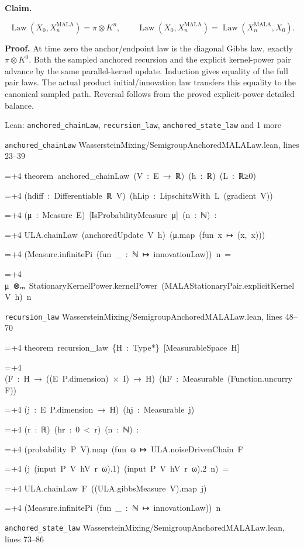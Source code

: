 \documentclass[11pt,a4paper]{report}
\newlength{\leancharwidth}
\newenvironment{leancode}{\par\smallskip\begingroup\ttfamily\footnotesize\raggedright
  \settowidth{\leancharwidth}{M}\setlength{\parskip}{0pt}\setlength{\parindent}{0pt}
  \frenchspacing}{\par\endgroup\smallskip}
\newcommand{\leanline}[2]{\hangindent=\dimexpr#1\leancharwidth+4\leancharwidth\relax
  \hangafter=1\noindent\hspace*{#1\leancharwidth}#2\par}
\newcommand{\leansource}[1]{\par{\footnotesize\color{leanmuted}#1}\par}
\begin{document}
\textbf{Claim.}

\[\operatorname{Law}(X_0,X_n^{\mathrm{MALA}})=\pi\otimes K^n,\qquad \operatorname{Law}(X_0,X_n^{\mathrm{MALA}})=\operatorname{Law}(X_n^{\mathrm{MALA}},X_0).\]

\textbf{Proof.} At time zero the anchor/\allowbreak{}endpoint law is the diagonal Gibbs law, exactly \(\pi\otimes K^0\). Both the sampled anchored recursion and the explicit kernel-power pair advance by the same parallel-kernel update. Induction gives equality of the full pair laws. The actual product initial/\allowbreak{}innovation law transfers this equality to the canonical sampled path. Reversal follows from the proved explicit-power detailed balance.

\begin{leanbox}{Lean: \texttt{anchored\_\allowbreak{}chainLaw}, \texttt{recursion\_\allowbreak{}law}, \texttt{anchored\_\allowbreak{}state\_\allowbreak{}law} and 1 more}
\leansource{\texttt{anchored\_\allowbreak{}chainLaw} \quad WassersteinMixing/\allowbreak{}SemigroupAnchoredMALALaw.lean, lines 23–39}
\begin{leancode}
\leanline{0}{theorem\ anchored\_chainLaw\ (V\ :\ E\ →\ ℝ)\ (h\ :\ ℝ)\ (L\ :\ ℝ≥0)}
\leanline{4}{(hdiff\ :\ Differentiable\ ℝ\ V)\ (hLip\ :\ LipschitzWith\ L\ (gradient\ V))}
\leanline{4}{(μ\ :\ Measure\ E)\ [IsProbabilityMeasure\ μ]\ (n\ :\ ℕ)\ :}
\leanline{4}{ULA.chainLaw\ (anchoredUpdate\ V\ h)\ (μ.map\ (fun\ x\ ↦\ (x,\ x)))}
\leanline{6}{(Measure.infinitePi\ (fun\ \_\ :\ ℕ\ ↦\ innovationLaw))\ n\ =}
\leanline{8}{μ\ ⊗ₘ\ StationaryKernelPower.kernelPower\ (MALAStationaryPair.explicitKernel\ V\ h)\ n}
\end{leancode}
\leansource{\texttt{recursion\_\allowbreak{}law} \quad WassersteinMixing/\allowbreak{}SemigroupAnchoredMALALaw.lean, lines 48–70}
\begin{leancode}
\leanline{0}{theorem\ recursion\_law\ \{H\ :\ Type*\}\ [MeasurableSpace\ H]}
\leanline{4}{(F\ :\ H\ →\ ((E\ P.dimension)\ ×\ I)\ →\ H)\ (hF\ :\ Measurable\ (Function.uncurry\ F))}
\leanline{4}{(j\ :\ E\ P.dimension\ →\ H)\ (hj\ :\ Measurable\ j)}
\leanline{4}{(r\ :\ ℝ)\ (hr\ :\ 0\ <\ r)\ (n\ :\ ℕ)\ :}
\leanline{4}{(probability\ P\ V).map\ (fun\ ω\ ↦\ ULA.noiseDrivenChain\ F}
\leanline{6}{(j\ (input\ P\ V\ hV\ r\ ω).1)\ (input\ P\ V\ hV\ r\ ω).2\ n)\ =}
\leanline{6}{ULA.chainLaw\ F\ ((ULA.gibbsMeasure\ V).map\ j)}
\leanline{8}{(Measure.infinitePi\ (fun\ \_\ :\ ℕ\ ↦\ innovationLaw))\ n}
\end{leancode}
\leansource{\texttt{anchored\_\allowbreak{}state\_\allowbreak{}law} \quad WassersteinMixing/\allowbreak{}SemigroupAnchoredMALALaw.lean, lines 73–86}

\end{leanbox}
\end{document}
